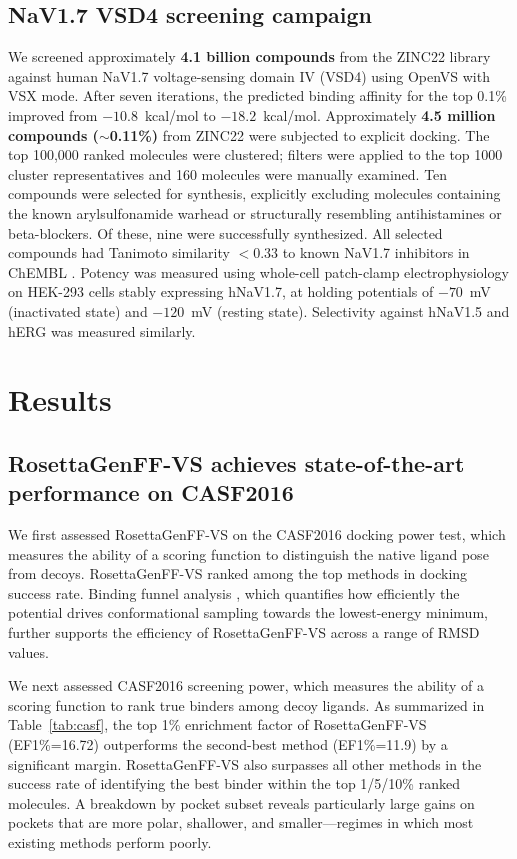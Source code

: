\documentclass[11pt]{article}
\begin{document}
\subsection{NaV1.7 VSD4 screening campaign}
We screened approximately \textbf{4.1 billion compounds} from the ZINC22 library \citep{irwin2020zinc20,tingle2022zinc22} against human NaV1.7 voltage-sensing domain IV (VSD4) using OpenVS with VSX mode. After seven iterations, the predicted binding affinity for the top 0.1\% improved from $-10.8$~kcal/mol to $-18.2$~kcal/mol. Approximately \textbf{4.5 million compounds ($\sim$0.11\%)} from ZINC22 were subjected to explicit docking. The top 100{,}000 ranked molecules were clustered; filters were applied to the top 1000 cluster representatives and 160 molecules were manually examined. Ten compounds were selected for synthesis, explicitly excluding molecules containing the known arylsulfonamide warhead or structurally resembling antihistamines or beta-blockers. Of these, nine were successfully synthesized. All selected compounds had Tanimoto similarity $<0.33$ to known NaV1.7 inhibitors in ChEMBL \citep{mendez2019chembl,davies2015chembl}. Potency was measured using whole-cell patch-clamp electrophysiology on HEK-293 cells stably expressing hNaV1.7, at holding potentials of $-70$~mV (inactivated state) and $-120$~mV (resting state). Selectivity against hNaV1.5 and hERG was measured similarly.

\section{Results}
\subsection{RosettaGenFF-VS achieves state-of-the-art performance on CASF2016}
We first assessed RosettaGenFF-VS on the CASF2016 docking power test, which measures the ability of a scoring function to distinguish the native ligand pose from decoys. RosettaGenFF-VS ranked among the top methods in docking success rate. Binding funnel analysis \citep{li2018casf2016comprehensive}, which quantifies how efficiently the potential drives conformational sampling towards the lowest-energy minimum, further supports the efficiency of RosettaGenFF-VS across a range of RMSD values.

We next assessed CASF2016 screening power, which measures the ability of a scoring function to rank true binders among decoy ligands. As summarized in Table~\ref{tab:casf}, the top 1\% enrichment factor of RosettaGenFF-VS (EF1\%=16.72) outperforms the second-best method (EF1\%=11.9) by a significant margin. RosettaGenFF-VS also surpasses all other methods in the success rate of identifying the best binder within the top 1/5/10\% ranked molecules. A breakdown by pocket subset reveals particularly large gains on pockets that are more polar, shallower, and smaller---regimes in which most existing methods perform poorly.
\end{document}
